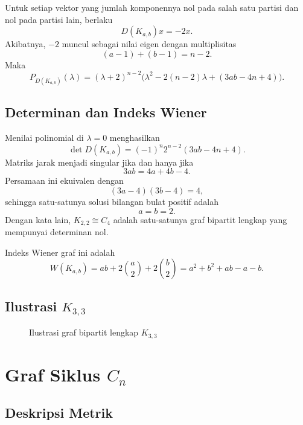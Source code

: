 \documentclass[12pt,a4paper]{article}
\begin{document}
Untuk setiap vektor yang jumlah komponennya nol pada salah satu partisi dan nol pada partisi lain, berlaku
\[
  D(K_{a,b})x=-2x.
\]
Akibatnya, $-2$ muncul sebagai nilai eigen dengan multiplisitas
\[
  (a-1)+(b-1)=n-2.
\]
Maka
\[
  P_{D(K_{a,b})}(\lambda)
  =
  (\lambda+2)^{n-2}
  \bigl(\lambda^2-2(n-2)\lambda+(3ab-4n+4)\bigr).
\]

\subsection{Determinan dan Indeks Wiener}

Menilai polinomial di $\lambda=0$ menghasilkan
\[
  \det D(K_{a,b})
  =
  (-1)^n 2^{n-2}(3ab-4n+4).
\]
Matriks jarak menjadi singular jika dan hanya jika
\[
  3ab=4a+4b-4.
\]
Persamaan ini ekuivalen dengan
\[
  (3a-4)(3b-4)=4,
\]
sehingga satu-satunya solusi bilangan bulat positif adalah
\[
  a=b=2.
\]
Dengan kata lain, $K_{2,2}\cong C_4$ adalah satu-satunya graf bipartit lengkap yang mempunyai determinan nol.

Indeks Wiener graf ini adalah
\[
  W(K_{a,b})
  =ab+2\binom{a}{2}+2\binom{b}{2}
  =a^2+b^2+ab-a-b.
\]

\subsection{Ilustrasi $K_{3,3}$}

\begin{figure}[h!]
  \centering
  \caption{Ilustrasi graf bipartit lengkap $K_{3,3}$}
  \label{fig:k33}
\end{figure}

\section{Graf Siklus $C_n$}

\subsection{Deskripsi Metrik}
\end{document}
